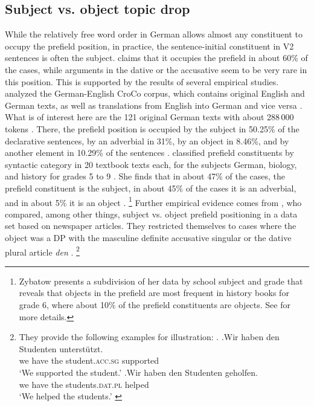 \subsection{Subject vs. object topic drop}
While the relatively free word order in German allows almost any constituent to occupy the prefield position,  in practice, the sentence-initial constituent in V2 sentences is often the subject.
\citet[44]{engel1972} claims that it occupies the prefield in about 60\% of the cases, while arguments  in the dative  or the accusative  seem to be very rare in this position.
This is supported by the results of several empirical studies.
\citet{hansen-schirra.gutermuth2017} analyzed the German-English CroCo corpus,   which contains original English and German texts, as well as translations from English into German and vice versa \citep{hansen-schirra.etal2012}.
What is of interest here are the 121 original German texts with about 288\,000 tokens \citep[31]{hansen-schirra.etal2012}.
There, the prefield position is occupied by the subject in 50.25\% of the declarative sentences, by an adverbial  in 31\%, by an object in 8.46\%, and by another element in 10.29\% of the sentences \citep[311]{hansen-schirra.gutermuth2017}.
\citet{zybatow2014} classified prefield constituents by syntactic category in 20 textbook texts each, for the subjects German, biology, and history for grades 5 to 9 \citep[97]{zybatow2014}.
She finds that in about 47\% of the cases, the prefield constituent is the subject, in about 45\% of the cases it is an adverbial,  and in about 5\% it is an object \citep[98]{zybatow2014}.%
\footnote{Zybatow presents a subdivision of her data by school subject and grade that reveals that objects in the prefield are most frequent in history books for grade 6, where about 10\% of the prefield constituents are objects.
See \citet[98]{zybatow2014} for more details.}
%
Further empirical evidence comes from \citet{bader.haeussler2010}, who compared, among other things, subject vs. object prefield positioning in a data set based on newspaper articles.
They restricted themselves to cases where the object was a DP with the masculine definite accusative singular or the dative  plural article \textit{den} \citep[see for details][722--723]{bader.haeussler2010}.%
\footnote{They provide the following examples for illustration:
\ex.
\ag.Wir haben den Studenten unterstützt.\\
we have the student.\textsc{acc.sg} supported\\
`We supported the student.'
\bg.Wir haben den Studenten geholfen.\\
we have the students.\textsc{dat.pl} helped\\
`We helped the students.' \citep[722]{bader.haeussler2010}\par
\vspace{-1.75\baselineskip}
}
